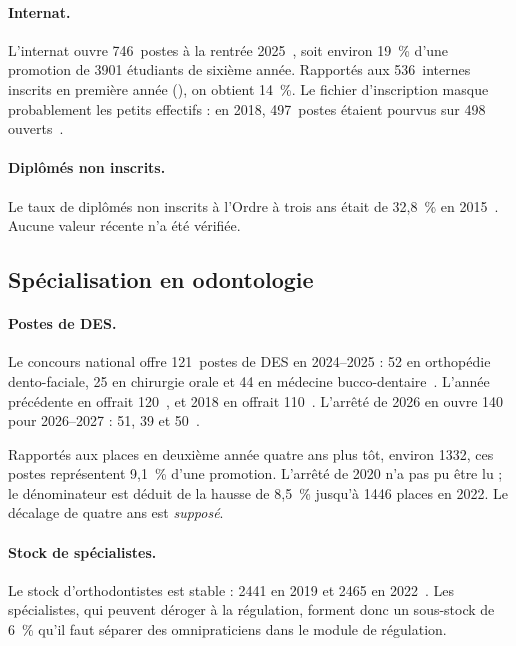 \documentclass[11pt]{article}
\begin{document}
\paragraph{Internat.}
L'internat ouvre \num{746}~postes à la rentrée 2025~\cite{arrete2024pharma},
soit environ 19~\%\derive{} d'une promotion de \num{3901} étudiants de
sixième année. Rapportés aux \num{536}~internes inscrits en première année
(\mesure), on obtient 14~\%\derive{}. Le fichier d'inscription masque
probablement les petits effectifs : en 2018, 497~postes étaient pourvus sur
498 ouverts~\cite{cng2018}.

\paragraph{Diplômés non inscrits.}
Le taux de diplômés non inscrits à l'Ordre à trois ans était de 32,8~\% en
2015~\cite{cnop2016}. Aucune valeur récente n'a été vérifiée.

\subsection{Spécialisation en odontologie}

\paragraph{Postes de DES.}
Le concours national offre \num{121}~postes de DES en 2024--2025 : \num{52}
en orthopédie dento-faciale, \num{25} en chirurgie orale et \num{44} en
médecine bucco-dentaire~\cite{arrete2024odonto}. L'année précédente en
offrait \num{120}~\cite{arrete2023odonto}, et 2018 en offrait
\num{110}~\cite{cng2018}. L'arrêté de 2026 en ouvre \num{140} pour
2026--2027 : 51, 39 et 50~\cite{arrete2026odonto}.

Rapportés aux places en deuxième année quatre ans plus tôt, environ
\num{1332}\derive{}, ces postes représentent 9,1~\%\derive{} d'une
promotion. L'arrêté de 2020 n'a pas pu être lu ; le dénominateur est déduit
de la hausse de 8,5~\% jusqu'à \num{1446} places en 2022. Le décalage de quatre
ans est \emph{supposé}\suppose{}.

\paragraph{Stock de spécialistes.}
Le stock d'orthodontistes est stable : \num{2441} en 2019 et \num{2465} en
2022~\cite{oncd2022}. Les spécialistes, qui peuvent déroger à la régulation, forment donc
un sous-stock de 6~\%\derive{} qu'il faut séparer des omnipraticiens dans le
module de régulation.
\end{document}

